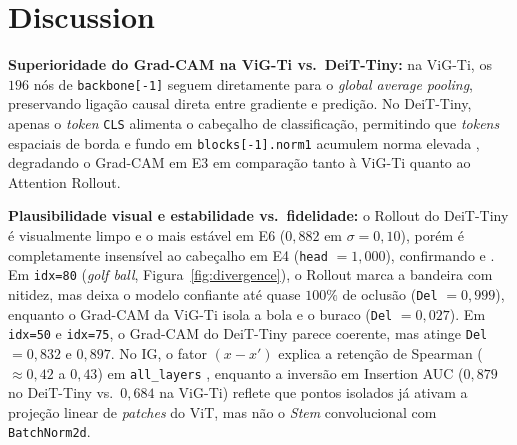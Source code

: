\documentclass{article}
\begin{document}
\section{Discussion}
\label{sec:discussion}

\textbf{Superioridade do Grad-CAM na ViG-Ti vs.\ DeiT-Tiny:} na ViG-Ti, os $196$ nós de \texttt{backbone[-1]} seguem diretamente para o \textit{global average pooling}, preservando ligação causal direta entre gradiente e predição. No DeiT-Tiny, apenas o \textit{token} \texttt{CLS} alimenta o cabeçalho de classificação, permitindo que \textit{tokens} espaciais de borda e fundo em \texttt{blocks[-1].norm1} acumulem norma elevada \citep{darcet2024registers}, degradando o Grad-CAM em E3 em comparação tanto à ViG-Ti quanto ao Attention Rollout.

\textbf{Plausibilidade visual e estabilidade vs.\ fidelidade:} o Rollout do DeiT-Tiny é visualmente limpo e o mais estável em E6 ($0{,}882$ em $\sigma = 0{,}10$), porém é completamente insensível ao cabeçalho em E4 (\texttt{head} $= 1{,}000$), confirmando \citet{chefer2021transformer} e \citet{adebayo2018sanity}. Em \texttt{idx=80} (\textit{golf ball}, Figura~\ref{fig:divergence}), o Rollout marca a bandeira com nitidez, mas deixa o modelo confiante até quase $100\%$ de oclusão (\texttt{Del} $= 0{,}999$), enquanto o Grad-CAM da ViG-Ti isola a bola e o buraco (\texttt{Del} $= 0{,}027$). Em \texttt{idx=50} e \texttt{idx=75}, o Grad-CAM do DeiT-Tiny parece coerente, mas atinge \texttt{Del} $= 0{,}832$ e $0{,}897$. No IG, o fator $(x - x')$ explica a retenção de Spearman ($\approx 0{,}42$ a $0{,}43$) em \texttt{all\_layers} \citep{adebayo2018sanity}, enquanto a inversão em Insertion AUC ($0{,}879$ no DeiT-Tiny vs.\ $0{,}684$ na ViG-Ti) reflete que pontos isolados já ativam a projeção linear de \textit{patches} do ViT, mas não o \textit{Stem} convolucional com \texttt{BatchNorm2d}.
\end{document}
